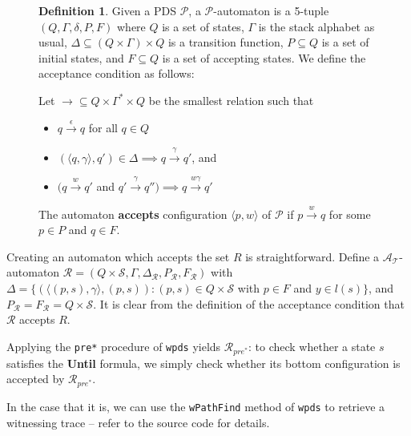 \documentclass[11pt]{article}
\theoremstyle{definition}
\newtheorem{mydef}{Definition}
\begin{document}
\begin{figure}
\caption{$\mathcal{P}$-automaton definition, based on Esparza et al. 2000}
\begin{mydef}
Given a PDS $\mathcal{P}$, a $\mathcal{P}$-automaton is a 5-tuple $(Q, \Gamma,
\delta, P, F)$ where $Q$ is a set of states, $\Gamma$ is the stack alphabet as
usual, $\Delta \subseteq (Q \times \Gamma) \times Q $ is a
transition function, $P \subseteq Q$ is a set of initial states, and $F
\subseteq Q$ is a set of accepting states.
We define the acceptance condition as follows:

Let $\rightarrow \subseteq Q \times \Gamma^* \times Q$ be the smallest relation such that
\begin{itemize}
\item{$q \xrightarrow{\epsilon} q$ for all $q \in Q$}
\item{$(\langle q, \gamma \rangle, q') \in \Delta \implies q \xrightarrow{\gamma} q'$, and}
\item{$(q \xrightarrow{w} q'$ and $q' \xrightarrow{\gamma} q'') \implies q \xrightarrow{w\gamma} q'$ }
\end{itemize}

The automaton \textbf{accepts} configuration $\langle p, w \rangle$ of $\mathcal{P}$ if $p \xrightarrow{w} q$ for some $p \in P$ and $q \in F$.
\end{mydef}
\label{fig:p-automata-def}
\end{figure}

Creating an automaton which accepts the set $R$ is straightforward. Define a
$\mathcal{A_T}$-automaton $\mathcal{R} = (Q \times \mathcal{S}, \Gamma,
\Delta_{\mathcal{R}}, P_{\mathcal{R}}, F_{\mathcal{R}})$ with $\Delta = \{
( \langle (p, s), \gamma \rangle, (p, s) ) : (p, s) \in Q \times \mathcal{S}$
with $p \in F$ and $y \in l(s) \}$, and $P_{\mathcal{R}} = F_{\mathcal{R}} = Q
\times \mathcal{S}$. It is clear from the definition of the acceptance
condition that $\mathcal{R}$ accepts $R$.

Applying the \texttt{pre*} procedure of \texttt{wpds} yields
$\mathcal{R}_{\textit{pre}^*}$: to check whether a state $s$ satisfies the
\textbf{Until} formula, we simply check whether its bottom configuration is
accepted by $\mathcal{R}_{\textit{pre}^*}$.

In the case that it is, we can use the \texttt{wPathFind} method of
\texttt{wpds} to retrieve a witnessing trace -- refer to the source code for
details.
\end{document}
